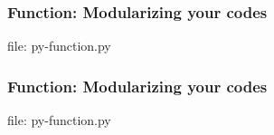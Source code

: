 \begin{frame}[fragile]
\frametitle{Function: Modularizing your codes}
\newcommand{\newfilename}{py-function.py}



file: \newfilename
\end{frame}


\begin{frame}[fragile]
\frametitle{Function: Modularizing your codes}
\newcommand{\newfilename}{py-function.py}



file: \newfilename
\end{frame}

